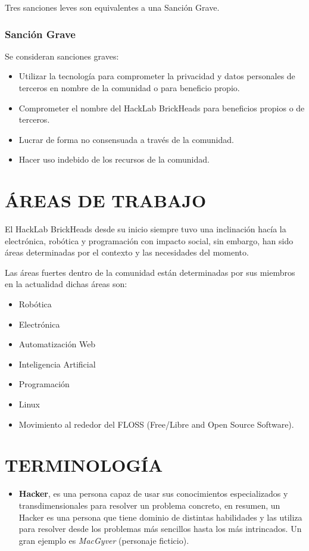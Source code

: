 \documentclass[12pt, letterpaper]{article}
\begin{document}
    Tres sanciones leves son equivalentes a una Sanción Grave.

    \subsubsection{Sanción Grave}
    Se consideran sanciones graves:
    \begin{itemize}
        \item Utilizar la tecnología para comprometer la privacidad y datos 
        personales de terceros en nombre de la comunidad o para beneficio 
        propio. 
        \item Comprometer el nombre del HackLab BrickHeads para beneficios 
        propios o de terceros.
        \item Lucrar de forma no consensuada a través de la comunidad.
        \item Hacer uso indebido de los recursos de la comunidad.
    \end{itemize}

    \section{ÁREAS DE TRABAJO}
    El HackLab BrickHeads desde su inicio siempre tuvo una inclinación hacía la 
    electrónica, robótica y programación con impacto social, sin embargo, han 
    sido áreas determinadas por el contexto y las necesidades del momento.
    
    Las áreas fuertes dentro de la comunidad están determinadas por sus miembros 
    en la actualidad dichas áreas son:
    \begin{itemize}
        \item Robótica
        \item Electrónica
        \item Automatización Web
        \item Inteligencia Artificial
        \item Programación
        \item Linux
        \item Movimiento al rededor del FLOSS (Free/Libre and Open Source 
        Software).
    \end{itemize}
    
    \section{TERMINOLOGÍA}
    \begin{itemize}
        \item \textbf{Hacker}, es una persona capaz de usar sus conocimientos 
        especializados y transdimensionales para resolver un problema concreto, 
        en resumen, un Hacker es una persona que tiene dominio de distintas 
        habilidades y las utiliza para resolver desde los problemas más 
        sencillos hasta los más intrincados. Un gran ejemplo es 
        \textit{MacGyver} (personaje ficticio).
    \end{itemize}
\end{document}
